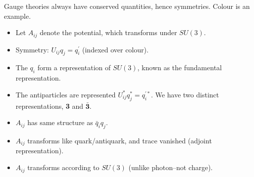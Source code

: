 \documentclass[]{article}
\begin{document}
Gauge theories  always have conserved quantities, hence symmetries. Colour is an example.
\begin{itemize}
	\item  Let $A_{ij}$ denote the potential, which transforms under $SU(3)$.
	\item Symmetry: $U_{ij} q_j = q^\prime_i$ (indexed over colour).
	\item The $q_i$ form a representation of $SU(3)$, known as the fundamental representation.
	\item The antiparticles are represented $U^*_{ij} q^*_j = q_i^{\prime*}$. We have two distinct representations, {\bfseries 3} and $\bm{\bar{3}}$.
	\item  $A_{ij}$ has same structure as $\bar{q}_i q_j$.
	\item $A_{ij}$ transforms like quark/antiquark, and  trace vanished (adjoint representation).
	\item $A_{ij}$ transforms according to $SU(3)$  (unlike photon--not charge).
\end{itemize}
\end{document}

